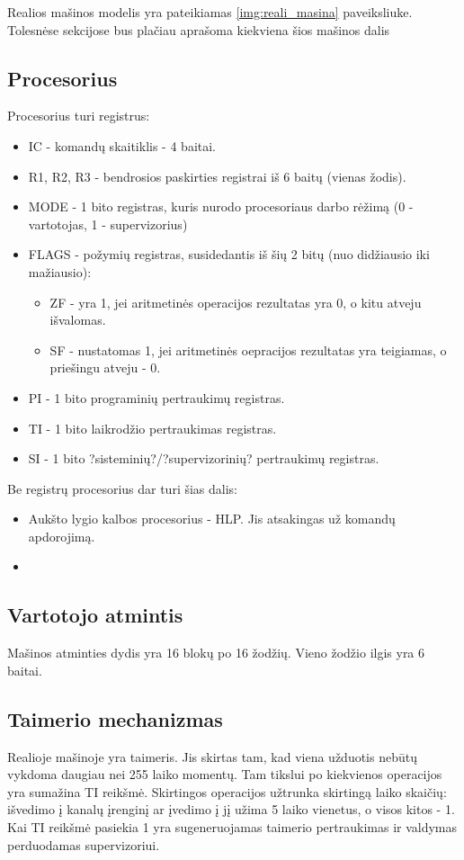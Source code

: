 \documentclass{VUMIFInfKursinis}
\begin{document}
Realios mašinos modelis yra pateikiamas \ref{img:reali_masina} paveiksliuke. Tolesnėse sekcijose bus plačiau aprašoma kiekviena šios mašinos dalis

\subsection{Procesorius}

Procesorius turi registrus:

\begin{itemize}
	\item IC - komandų skaitiklis - 4 baitai.
	\item R1, R2, R3 - bendrosios paskirties registrai iš 6 baitų (vienas žodis).
	\item MODE - 1 bito registras, kuris nurodo procesoriaus darbo rėžimą (0 - vartotojas, 1 - supervizorius)
	\item FLAGS - požymių  registras, susidedantis iš šių 2 bitų (nuo didžiausio iki mažiausio): 
	\begin{itemize}
		\item ZF - yra 1, jei aritmetinės operacijos rezultatas yra 0, o kitu atveju išvalomas.
		\item SF - nustatomas 1, jei aritmetinės oepracijos rezultatas yra teigiamas, o priešingu atveju - 0.
	\end{itemize}
	\item PI - 1 bito programinių pertraukimų registras.
	\item TI - 1 bito laikrodžio pertraukimas registras.
	\item SI - 1 bito ?sisteminių?/?supervizorinių? pertraukimų registras.
\end{itemize}

Be registrų procesorius dar turi šias dalis:
\begin{itemize}
	\item Aukšto lygio kalbos procesorius - HLP. Jis atsakingas už komandų apdorojimą.
	\item 
\end{itemize}

\subsection{Vartotojo atmintis}

Mašinos atminties dydis yra 16 blokų po 16 žodžių. Vieno žodžio ilgis yra 6 baitai.

\subsection{Taimerio mechanizmas}
Realioje mašinoje yra taimeris. Jis skirtas tam, kad viena užduotis nebūtų vykdoma daugiau nei 255 laiko momentų. Tam tikslui po kiekvienos operacijos yra sumažina TI reikšmė. Skirtingos operacijos užtrunka skirtingą laiko skaičių: išvedimo į kanalų įrenginį ar įvedimo į jį užima 5 laiko vienetus, o visos kitos - 1. Kai TI reikšmė pasiekia 1 yra sugeneruojamas taimerio pertraukimas ir valdymas perduodamas supervizoriui.
\end{document}
